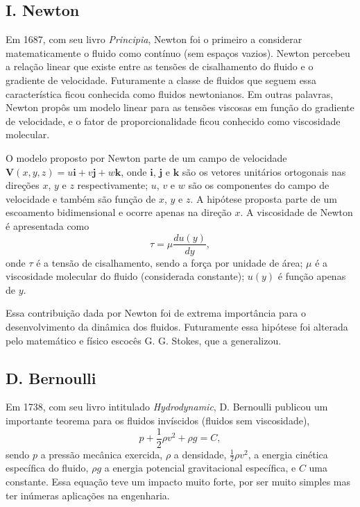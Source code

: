 \subsection{I. Newton}
Em 1687, com seu livro \emph{Principia}, Newton foi o primeiro a considerar matematicamente o fluido como contínuo (sem espaços vazios). Newton percebeu a relação linear que existe entre as tensões de cisalhamento do fluido e o gradiente de velocidade. Futuramente a classe de fluidos que seguem essa característica ficou conhecida como fluidos newtonianos. Em outras palavras, Newton propôs um modelo linear para as tensões viscosas em função do gradiente de velocidade, e o fator de proporcionalidade ficou conhecido como viscosidade molecular. 

O modelo proposto por Newton parte de um campo de velocidade $\textbf{V}(x, y, z) = u \textbf{i} + v\textbf{j} + w\textbf{k}$, onde $\textbf{i}$, $\textbf{j}$ e $\textbf{k}$ são os vetores unitários ortogonais nas direções $x$, $y$ e $z$ respectivamente; $u$, $v$ e $w$ são os componentes do campo de velocidade e também são função de $x$, $y$ e $z$. A hipótese proposta parte de um escoamento bidimensional e ocorre apenas na direção $x$. A viscosidade de Newton é apresentada como
\begin{equation*}
    \tau = \mu\frac{du(y)}{dy},
\end{equation*}
onde $\tau$ é a tensão de cisalhamento, sendo a força por unidade de área; $\mu$ é a viscosidade molecular do fluido (considerada constante); $u(y)$ é função apenas de $y$.

Essa contribuição dada por Newton foi de extrema importância para o desenvolvimento da dinâmica dos fluidos. Futuramente essa hipótese foi alterada pelo matemático e físico escocês G. G. Stokes, que a generalizou.

\subsection{D. Bernoulli}
Em 1738, com seu livro intitulado \emph{Hydrodynamic}, D. Bernoulli publicou um importante teorema para os fluidos invíscidos (fluidos sem viscosidade),
\begin{equation}
    p + \frac{1}{2}\rho v^2 + \rho g= C,
\end{equation}
sendo $p$ a pressão mecânica exercida, $\rho$ a densidade, $\frac{1}{2}\rho v^2$, a energia cinética específica do fluido, $\rho g$ a energia potencial gravitacional específica, e $C$ uma constante. Essa equação teve um impacto muito forte, por ser muito simples mas ter inúmeras aplicações na engenharia. 

